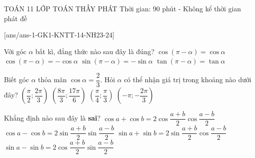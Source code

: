 \begin{name}
	{\tenchude}
	{TOÁN 11}
	{LỚP TOÁN THẦY PHÁT}
	{Thời gian: 90 phút - Không kể thời gian phát đề}
\end{name}
\TN
{}[ans/ans-1-GK1-KNTT-14-NH23-24]
\begin{ex}%
	Với góc $\alpha $ bất kì, đẳng thức nào sau đây là đúng?
	\choice
	{$\cos \left( \pi-\alpha \right)=\cos \alpha $}
	{\True $\cos \left( \pi-\alpha \right)=-\cos \alpha $}
	{$\sin \left( \pi-\alpha \right)=-\sin \alpha $}
	{$\tan \left( \pi-\alpha \right)=\tan \alpha $}
\end{ex}
\begin{ex}%
	Biết góc $\alpha $ thỏa mãn $\cos \alpha =\dfrac{2}{3}$. Hỏi $\alpha $ có thể nhận giá trị trong khoảng nào dưới đây?
	\choice
	{$\left( \dfrac{\pi}{2};\dfrac{2\pi}{3} \right)$}
	{$\left( \dfrac{8\pi}{3};\dfrac{17\pi}{6} \right)$}
	{\True $\left( \dfrac{\pi}{4};\dfrac{\pi}{3} \right)$}
	{$\left( -\pi;-\dfrac{2\pi}{3} \right)$}
\end{ex}
\begin{ex}%
	Khẳng định nào sau đây là \textbf{sai}?
	\choice
	{$\cos a+\cos b=2\cos \dfrac{a+b}{2}\cos \dfrac{a-b}{2}$}
	{\True $\cos a-\cos b=2\sin \dfrac{a+b}{2}\sin \dfrac{a-b}{2}$}
	{$\sin a+\sin b=2\sin \dfrac{a+b}{2}\cos \dfrac{a-b}{2}$}
	{$\sin a-\sin b=2\cos \dfrac{a+b}{2}\sin \dfrac{a-b}{2}$}
\end{ex}

